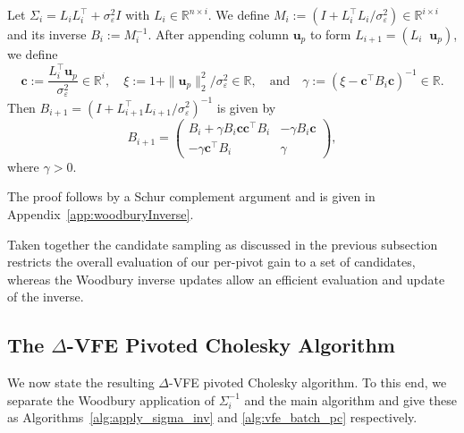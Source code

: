 \documentclass[onefignum,onetabnum]{siamart250211}
\newcommand{\R}{\mathbb{R}}
\begin{document}
\begin{lemma}
\label{lem:woodbury_update}
Let $\Sigma_i = L_i L_i^\top + \sigma_\varepsilon^2 I$ with $L_i \in \R^{n\times i}$. We define $M_i := (I + L_i^\top L_i/\sigma_\varepsilon^{2})\in \R^{i\times i}$ and its inverse $B_i := M_i^{-1}$.
After appending column $\bm{u}_p$ to form $L_{i+1} = (L_i \;\; \bm{u}_p)$, we define
\begin{equation}
    \bm{c} := \frac{L_i^\top \bm{u}_p}{\sigma^2_\varepsilon}\in\R^i, 
    \quad
    \xi := 1 + \|\bm{u}_p \|_2^2/\sigma_\varepsilon^2\in\R, \quad \text{and} \quad
    \gamma := (\xi - \bm{c}^\top B_i \bm{c})^{-1} \in \R.
\end{equation}
Then $B_{i+1} = (I + L_{i+1}^\top L_{i+1}/\sigma_\varepsilon^2)^{-1}$
is given by
\begin{equation}
    B_{i+1} =
    \begin{pmatrix}
        B_i + \gamma B_i \bm{c} \bm{c}^\top B_i & -\gamma B_i \bm{c} \\
        -\gamma \bm{c}^\top B_i            &  \gamma
    \end{pmatrix},
\end{equation}
where $\gamma > 0$.
\end{lemma}
The proof follows by a Schur complement argument and is given in Appendix~\ref{app:woodburyInverse}.

Taken together the candidate sampling as discussed in the previous subsection restricts the overall evaluation of our per-pivot gain to a set of candidates, whereas the  Woodbury inverse updates allow an efficient evaluation and update of the inverse. 

\subsection{The $\Delta$-VFE Pivoted Cholesky Algorithm}
We now state the resulting $\Delta$-VFE pivoted Cholesky algorithm. To this end, we separate the Woodbury application of $\Sigma_i^{-1}$ and the main algorithm and give these as Algorithms~\ref{alg:apply_sigma_inv} and \ref{alg:vfe_batch_pc} respectively.
\end{document}
